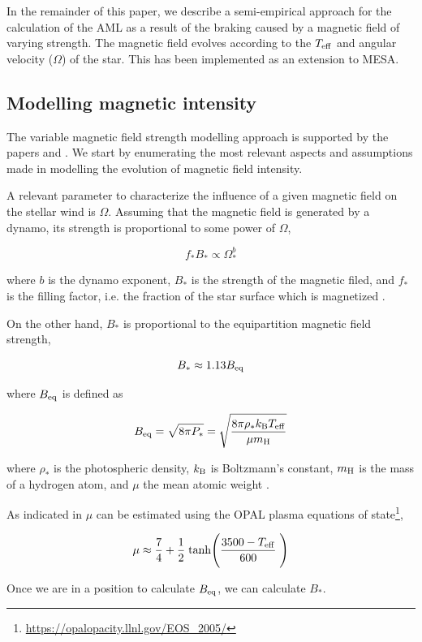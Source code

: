 \documentclass[fleqn,usenatbib]{mnras}
\begin{document}
In the remainder of this paper, we describe a semi-empirical approach for the calculation of the AML as a result of the braking caused by a magnetic field of varying strength. The magnetic field evolves according to the $T_{\mathrm{eff}}$ and angular velocity ($\Omega$) of the star. This has been implemented as an extension to MESA.

\subsection{Modelling magnetic intensity} \label{mod_mbi}
The variable magnetic field strength modelling approach is supported by the papers \cite{Cranmer2011} and \cite{Gallet2013}. We start by enumerating the most relevant aspects and assumptions made in modelling the evolution of magnetic field intensity.\par 

A relevant parameter to characterize the influence of a given magnetic field on the stellar wind is $\Omega$. Assuming that the magnetic field is generated by a dynamo, its strength is proportional to some power of $\Omega$,
\begin{ceqn}
\begin{equation}
    f_*B_* \propto \Omega_*^b \label{eq:mf_strenght}
\end{equation}
\end{ceqn}
where $b$ is the dynamo exponent, $B_*$ is the strength of the magnetic filed, and $f_*$ is the filling factor, i.e. the fraction of the star surface which is magnetized \citep{Gallet2013}.

On the other hand, $B_*$ is proportional to the equipartition magnetic field strength,
\begin{ceqn}
\begin{equation}
    B_* \approx 1.13 B_{\mathrm{eq}} \label{eq:mf_bstar}
\end{equation}
\end{ceqn}
where $B_{\mathrm{eq}}$ is defined as 
\begin{ceqn}
\begin{equation}
    B_{\mathrm{eq}} = \sqrt{8\pi P_*} = \sqrt{\frac{8\pi\rho_* k_{\mathrm{B}} T_{\mathrm{eff}}}{\mu m_{\mathrm{H}}}}\label{eq:mf_beq}    
\end{equation}
\end{ceqn}
where $\rho_*$ is the photospheric density, $k_{\mathrm{B}}$ is Boltzmann's constant, $m_{\mathrm{H}}$ is the mass of a hydrogen atom, and $\mu$ the mean atomic weight \citep{Cranmer2011}.

As indicated in \cite{Cranmer2011} $\mu$ can be estimated using the OPAL plasma equations of state\footnote{\url{https://opalopacity.llnl.gov/EOS_2005/}},
\begin{ceqn}
\begin{equation}
    \mu \approx \frac{7}{4} + \frac{1}{2} \; {\rm tanh}\Bigg(\frac{3500-T_{\mathrm{eff}}}{600}\;\Bigg) \label{eq:mf_atom_weight}
\end{equation}
\end{ceqn}
Once we are in a position to calculate $B_{\mathrm{eq}}$, we can calculate $B_*$.\par
\end{document}

